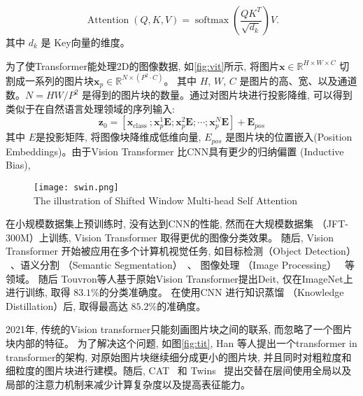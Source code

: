 \begin{equation}
    \operatorname{Attention}(Q, K, V)=\operatorname{softmax}\left(\frac{Q K^T}{\sqrt{d_k}}\right) V.
    \label{eq:attention}
\end{equation}
其中 $d_k$ 是 Key向量的维度。\par
为了使Transformer能处理2D的图像数据, 如\ref{fig:vit}所示, 将图片$\mathbf{x} \in \mathbb{R}^{H \times W \times C}$ 切割成一系列的图片块$\mathbf{x}_p \in \mathbb{R}^{N \times\left(P^2 \cdot C\right)}$。 其中 $H$, $W$, $C$ 是图片的高、宽、以及通道数。$N=H W / P^2$ 是得到的图片块的数量。通过对图片块进行投影降维, 可以得到类似于在自然语言处理领域的序列输入:
\begin{equation}
    \mathbf{z}_0=\left[\mathbf{x}_{\text {class }} ; \mathbf{x}_p^1 \mathbf{E} ; \mathbf{x}_p^2 \mathbf{E} ; \cdots ; \mathbf{x}_p^N \mathbf{E}\right]+\mathbf{E}_{p o s}
\end{equation}
其中 $E$是投影矩阵, 将图像块降维成低维向量, $E_{pos}$ 是图片块的位置嵌入(Position Embeddings)。由于Vision Transformer 比CNN具有更少的归纳偏置 (Inductive Bias),
\begin{figure}[!htp]
    \centering
    \texttt{[image: swin.png]} \\
      {The illustration of Shifted Window Multi-head Self Attention }
   \label{fig:swin}
\end{figure}
在小规模数据集上预训练时, 没有达到CNN的性能, 然而在大规模数据集 （JFT-300M）上训练, Vision Transformer 取得更优的图像分类效果。 随后, Vision Transformer 开始被应用在多个计算机视觉任务, 如目标检测（Object Detection） ~\cite{carion2020end, zhu2021deformable}、语义分割 （Semantic Segmentation）~\cite{zheng2021rethinking, xie2021segformer, strudel2021segmenter, jin2021trseg, zhu2021unified}、 图像处理 （Image Processing）~\cite{chen2021pre} 等领域。 随后 Touvron等人基于原始Vision Transformer提出Deit, 仅在ImageNet上进行训练, 取得 $83.1\%$的分类准确度。 在使用CNN 进行知识蒸馏 （Knowledge Distillation）后, 取得最高达 $85.2\%$的准确度。\par

2021年, 传统的Vision transformer只能刻画图片块之间的联系, 而忽略了一个图片块内部的特征。 为了解决这个问题, 如图\ref{fig:tit}, Han 等人提出一个transformer in transformer的架构, 对原始图片块继续细分成更小的图片块, 并且同时对粗粒度和细粒度的图片块进行建模。随后, CAT~\cite{lin2022cat} 和 Twins~\cite{chu2021twins} 提出交替在层间使用全局以及局部的注意力机制来减少计算复杂度以及提高表征能力。\par


